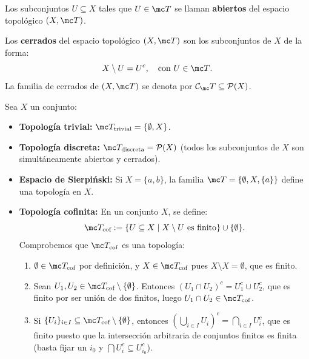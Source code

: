 \begin{defi}
Los subconjuntos \(U \subseteq X\) tales que \(U \in \mc T\) se llaman \textbf{abiertos} del espacio topológico \((X, \mc T)\).
\end{defi}

\begin{defi}
Los \textbf{cerrados} del espacio topológico \((X, \mc T)\) son los subconjuntos de \(X\) de la forma:
\[
    X \setminus U = U^c, \quad \text{con } U \in \mc T \text{}.
\]
La familia de cerrados de \((X, \mc T)\) se denota por \(\mathcal{C}_\mc T \subseteq \mathcal{P}(X)\).
\end{defi}

\begin{ejem}
Sea \(X\) un conjunto:
\begin{itemize}
    \item \textbf{Topología trivial:} \(\mc T_{\text{trivial}} = \{\emptyset, X\}\).
    \item \textbf{Topología discreta:} \(\mc T_{\text{discreta}} = \mathcal{P}(X)\) (todos los subconjuntos de \(X\) son simultáneamente abiertos y cerrados).
    \item \textbf{Espacio de Sierpiński:} Si \(X = \{a, b\}\), la familia \(\mc T = \{\emptyset, X, \{a\}\}\) define una topología en \(X\).
    \item \textbf{Topología cofinita:} En un conjunto \(X\), se define:
    \[
        \mc T_{\text{cof}} := \{U \subseteq X \mid X \setminus U \text{ es finito}\} \cup \{\emptyset\} \text{}.
    \]
    Comprobemos que \(\mc T_{\text{cof}}\) es una topología:
    \begin{enumerate}
        \item[\textbf{1)}] \(\emptyset \in \mc T_{\text{cof}}\) por definición, y \(X \in \mc T_{\text{cof}}\) pues \(X \setminus X = \emptyset\), que es finito.
        \item[\textbf{2)}] Sean \(U_1, U_2 \in \mc T_{\text{cof}} \setminus \{\emptyset\}\). Entonces \((U_1 \cap U_2)^c = U_1^c \cup U_2^c\), que es finito por ser unión de dos finitos, luego \(U_1 \cap U_2 \in \mc T_{\text{cof}}\).
        \item[\textbf{3)}] Si \(\{U_i\}_{i \in I} \subseteq \mc T_{\text{cof}} \setminus \{\emptyset\}\), entonces \(\left(\bigcup_{i \in I} U_i\right)^c = \bigcap_{i \in I} U_i^c\), que es finito puesto que la intersección arbitraria de conjuntos finitos es finita (basta fijar un \(i_0\) y \(\bigcap U_i^c \subseteq U_{i_0}^c\)).
    \end{enumerate}

\end{itemize}
\end{ejem}
